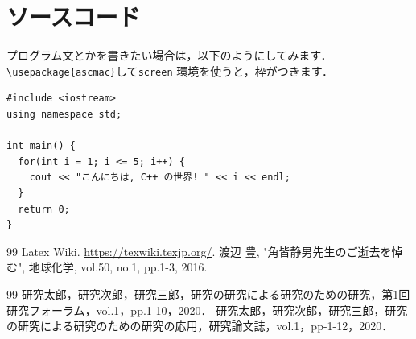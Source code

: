 \documentclass[a4paper,11pt]{jreport} %
\begin{document}
\appendix
\chapter{ソースコード}
\label{apndx:src}

プログラム文とかを書きたい場合は，以下のようにしてみます．\verb|\usepackage{ascmac}|して\verb|screen| 環境を使うと，枠がつきます．

\begin{screen}\begin{verbatim}
#include <iostream>
using namespace std;

int main() {
  for(int i = 1; i <= 5; i++) {
    cout << "こんにちは, C++ の世界! " << i << endl;
  }
  return 0;
}
\end{verbatim}\end{screen}

\clearpage

\renewcommand{\bibname}{参考文献}

\begin{thebibliography}{99}
   Latex Wiki. \url{https://texwiki.texjp.org/}.
   渡辺 豊, "角皆静男先生のご逝去を悼む", 地球化学, vol.50, no.1, pp.1-3, 2016.
\end{thebibliography}

% 
% 

\clearpage

\renewcommand{\bibname}{研究業績}

\begin{thebibliography}{99}
  \bibitem{} 研究太郎，研究次郎，研究三郎，研究の研究による研究のための研究，第1回研究フォーラム，vol.1，pp.1-10，2020．
  \bibitem{} 研究太郎，研究次郎，研究三郎，研究の研究による研究のための研究の応用，研究論文誌，vol.1，pp-1-12，2020．
\end{thebibliography}

\clearpage

\end{document}
